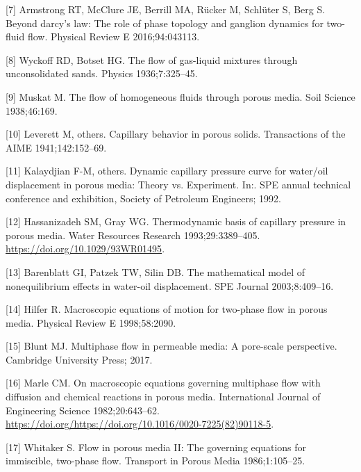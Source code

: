 \documentclass[]{article}
\begin{document}
\leavevmode\hypertarget{ref-armstrong2016beyond}{}%
{[}7{]} Armstrong RT, McClure JE, Berrill MA, Rücker M, Schlüter S, Berg
S. Beyond darcy's law: The role of phase topology and ganglion dynamics
for two-fluid flow. Physical Review E 2016;94:043113.

\leavevmode\hypertarget{ref-wyckoff1936flow}{}%
{[}8{]} Wyckoff RD, Botset HG. The flow of gas-liquid mixtures through
unconsolidated sands. Physics 1936;7:325--45.

\leavevmode\hypertarget{ref-muskat1938flow}{}%
{[}9{]} Muskat M. The flow of homogeneous fluids through porous media.
Soil Science 1938;46:169.

\leavevmode\hypertarget{ref-leverett1941capillary}{}%
{[}10{]} Leverett M, others. Capillary behavior in porous solids.
Transactions of the AIME 1941;142:152--69.

\leavevmode\hypertarget{ref-kalaydjian1992dynamic}{}%
{[}11{]} Kalaydjian F-M, others. Dynamic capillary pressure curve for
water/oil displacement in porous media: Theory vs. Experiment. In:. SPE
annual technical conference and exhibition, Society of Petroleum
Engineers; 1992.

\leavevmode\hypertarget{ref-Hassanizadeh1993}{}%
{[}12{]} Hassanizadeh SM, Gray WG. Thermodynamic basis of capillary
pressure in porous media. Water Resources Research 1993;29:3389--405.
\url{https://doi.org/10.1029/93WR01495}.

\leavevmode\hypertarget{ref-barenblatt2003mathematical}{}%
{[}13{]} Barenblatt GI, Patzek TW, Silin DB. The mathematical model of
nonequilibrium effects in water-oil displacement. SPE Journal
2003;8:409--16.

\leavevmode\hypertarget{ref-hilfer1998macroscopic}{}%
{[}14{]} Hilfer R. Macroscopic equations of motion for two-phase flow in
porous media. Physical Review E 1998;58:2090.

\leavevmode\hypertarget{ref-blunt2017multiphase}{}%
{[}15{]} Blunt MJ. Multiphase flow in permeable media: A pore-scale
perspective. Cambridge University Press; 2017.

\leavevmode\hypertarget{ref-MARLE1982643}{}%
{[}16{]} Marle CM. On macroscopic equations governing multiphase flow
with diffusion and chemical reactions in porous media. International
Journal of Engineering Science 1982;20:643--62.
\url{https://doi.org/https://doi.org/10.1016/0020-7225(82)90118-5}.

\leavevmode\hypertarget{ref-Whitaker1986a}{}%
{[}17{]} Whitaker S. Flow in porous media II: The governing equations
for immiscible, two-phase flow. Transport in Porous Media
1986;1:105--25.
\end{document}
